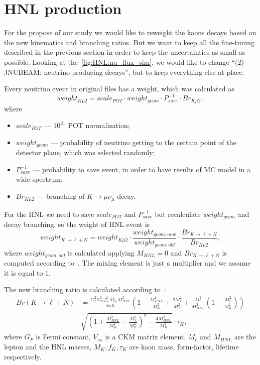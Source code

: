 \documentclass[../main.tex]{subfiles}
\begin{document}
\section{HNL production}

For the propose of our study we would like to reweight the kaons decays based on the new kinematics and branching ratios. But we want to keep all the fine-tuning described in the previous section in order to keep the uncertainties as small as possible. Looking at the~\autoref{fig:HNL:nu_flux_sim}, we would like to change ``(2) JNUBEAM: neutrino-producing decays'', but to keep everything else at place.

Every neutrino event in original files has a weight, which was calculated as
\begin{equation}
    weight_{K\mu2}=scale_{POT}\cdot weight_{geom}\cdot P_{save}^{-1}\cdot Br_{K\mu2},
\end{equation}
where
\begin{itemize}
    \item $scale_{POT}$ --- $10^{21}$ POT normalization;
    \item $weight_{geom}$ --- probability of neutrino getting to the certain point of the detector plane, which was selected randomly;
    \item$P_{save}^{-1}$ --- probability to save event, in order to have results of MC model in a wide spectrum;
    \item $Br_{K\mu2}$ --- branching of $K\rightarrow\mu\nu_{\mu}$ decay.
\end{itemize}

For the HNL we need to save $scale_{POT}$ and $P_{save}^{-1}$ but recalculate $weight_{geom}$ and decay branching, so the weight of HNL event is
\begin{equation}
    weight_{K\rightarrow \ell+N}=weight_{K\mu2}\cdot\frac{weight_{geom,new}}{weight_{geom,old}}\cdot \frac{Br_{K\rightarrow \ell+N}}{Br_{K\mu2}},
    \label{eq:HNL:weightDif}
\end{equation}
where $weight_{geom,old}$ is calculated applying $M_{HNL}=0$ and $Br_{K\rightarrow \ell+N}$ is computed according to~\cite{Gorbunov2007}. The mixing element is just a multiplier and we assume it is equal to 1.

The new branching ratio is calculated according to~\cite{Gorbunov2007}:
\begin{equation}
    \begin{split}
    Br(K\rightarrow \ell+N)&=\frac{G_F^2 V_{us}^2 f_K^2 M_K M_{HNL}^2}{8\pi\hbar}\left(1-\frac{M_{HNL}^2}{M_K^2}+\frac{2M_\ell ^2}{M_K^2}+\frac{M_\ell^2}{M_{HNL}^2}\left(1-\frac{M_\ell^2}{M_K^2}\right)\right) \\
&\sqrt{\left(1+\frac{M_{HNL}^2}{M_K^2}-\frac{M_\ell^2}{M_K^2}\right)^2-\frac{4M_{HNL}^2}{M_K^2}} \cdot\tau_K,
    \end{split}
    \label{eq:HNL:Kdecay}
\end{equation}
where $G_F$ is Fermi constant, $V_{us}$ is a CKM matrix element, $M_\ell$ and $M_{HNL}$ are the lepton and the HNL masses, $M_K, f_K, \tau_K$ are kaon mass, form-factor, lifetime respectively.
\end{document}
